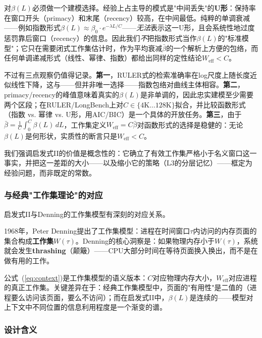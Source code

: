 对$\beta(L)$必须做一个建模选择。经验上占主导的模式是"中间丢失"的\textbf{U形}\cite{liu2023lostmiddle}：保持率在窗口开头（primacy）和末尾（recency）较高，在中间最低。纯粹的单调衰减——例如指数形式$\beta(L) \approx \beta_0 \cdot e^{-\lambda L / C}$——\emph{无法}表示这一U形，且会系统性地过度惩罚靠后窗口（recency）的信息。因此我们\emph{不}把指数形式当作$\beta(L)$的"标准模型"；它只在需要闭式工作集估计时，作为平均衰减$\bar{\beta}$的一个解析上方便的包络，而任何单调递减形式（线性、幂律、指数）都给出同样的定性结论$W_{\mathrm{eff}} < C$。

不过有三点观察仍值得记录。\textbf{第一}，RULER式的检索准确率在log尺度上随长度近似线性下降\cite{ruler2024}，这与——但并非唯一选择——指数包络对曲线主体相容。\textbf{第二}，primacy/recency的峰值意味着真实的$\beta(L)$是非单调的，因此忠实建模至少需要两个区段；在RULER/LongBench上对$C \in \{4\mathrm{K}\dots128\mathrm{K}\}$拟合，并比较函数形式（指数 vs. 幂律 vs. U形，用AIC/BIC）是一个具体的开放任务。\textbf{第三}，由于$\bar{\beta} = \tfrac{1}{C}\int_0^C \beta(L)\,dL$，工作集定义$W_{\mathrm{eff}} = C\bar{\beta}$对函数形式的选择是稳健的：无论$\beta(L)$是何形状，实质性的断言只是$W_{\mathrm{eff}} < C$。

我们强调启发式II的价值是概念性的：它确立了有效工作集严格小于名义窗口这一事实，并把这一差距的大小——以及缩小它的策略（L3的分层记忆）——框定为经验问题，而非既定的常数。

\subsubsection{与经典"工作集理论"的对应}

启发式II与Denning的工作集模型有深刻的对应关系\cite{denning1968thrashing}。

1968年，Peter Denning提出了工作集模型：进程在时间窗口$\tau$内访问的内存页面的集合构成\textbf{工作集}$W(\tau)$。Denning的核心洞察是：如果物理内存小于$W(\tau)$，系统就会发生\textbf{thrashing}（颠簸）——CPU大部分时间在等待页面换入换出，而不是在做有用的工作\cite{denning1968thrashing,denning2020workingset}。

公式~(\ref{eq:context})是工作集模型的语义版本：$C$对应物理内存大小，$W_{\mathrm{eff}}$对应进程的真正工作集。关键差异在于：经典工作集模型中，页面的"有用性"是二值的（进程要么访问该页面，要么不访问）；而在启发式II中，$\beta(L)$是连续的——模型对上下文中不同位置的信息利用程度是一个渐变的谱。

\subsubsection{设计含义}

